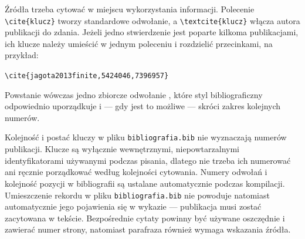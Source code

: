 Źródła trzeba cytować w miejscu wykorzystania informacji. Polecenie \verb|\cite{klucz}| tworzy standardowe odwołanie, a \verb|\textcite{klucz}| włącza autora publikacji do zdania. Jeżeli jedno stwierdzenie jest poparte kilkoma publikacjami, ich klucze należy umieścić w jednym poleceniu i rozdzielić przecinkami, na przykład:

\begin{center}
\verb|\cite{jagota2013finite,5424046,7396957}|
\end{center}

Powstanie wówczas jedno zbiorcze odwołanie \cite{jagota2013finite,5424046,7396957}, które styl bibliograficzny odpowiednio uporządkuje i — gdy jest to możliwe — skróci zakres kolejnych numerów.

Kolejność i postać kluczy w pliku \texttt{bibliografia.bib} nie wyznaczają numerów publikacji. Klucze są wyłącznie wewnętrznymi, niepowtarzalnymi identyfikatorami używanymi podczas pisania, dlatego nie trzeba ich numerować ani ręcznie porządkować według kolejności cytowania. Numery odwołań i kolejność pozycji w bibliografii są ustalane automatycznie podczas kompilacji. Umieszczenie rekordu w pliku \texttt{bibliografia.bib} nie powoduje natomiast automatycznie jego pojawienia się w wykazie — publikacja musi zostać zacytowana w tekście. Bezpośrednie cytaty powinny być używane oszczędnie i zawierać numer strony, natomiast parafraza również wymaga wskazania źródła.
